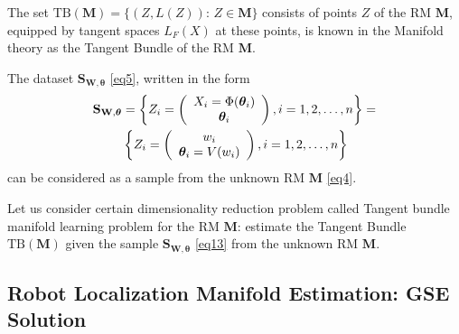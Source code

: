 \documentclass[conference]{IEEEtran} %
\def\mbtheta{{\bm\theta}}
\def\mbM{\mathbf{M}}
\def\mbS{\mathbf{S}}
\begin{document}
The set $\mathrm{TB}(\mbM) = \{(Z, L(Z)):\, Z \in \mbM\}$ consists of points $Z$ of the RM $\mbM$, equipped by tangent spaces $L_F(X)$ at these points, is known in the Manifold theory \cite{bib25} as the Tangent Bundle of the RM $\mbM$.

The dataset $\mbS_{\mathbf{W},\mbtheta}$ \eqref{eq5}, written in the form
\begin{align}
    \mbS_{\mathbf{W},\mbtheta} 
    &= \left\{Z_i=
    \left(
    \begin{array}{c}
    X_i = \Phi(\mbtheta_i)\\
    \mbtheta_i
    \end{array}
    \right), i = 1,2,\ldots,n\right\}=\notag\\
    &\left\{Z_i=
    \left(
    \begin{array}{c}
    w_i\\
    \mbtheta_i = V(w_i)
    \end{array}
    \right), i = 1,2,\ldots,n\right\}
    	\label{eq13}
\end{align}
can be considered as a sample from the unknown RM $\mbM$ \eqref{eq4}.

Let us consider certain dimensionality reduction problem called Tangent bundle manifold learning problem \cite{bib26} for the RM $\mbM$: estimate the Tangent Bundle $\mathrm{TB}(\mbM)$ given the sample $\mbS_{\mathbf{W},\mbtheta}$ \eqref{eq13} from the unknown RM $\mbM$.

\subsection{Robot Localization Manifold Estimation: GSE Solution}
\label{sec4.2}
\end{document}
